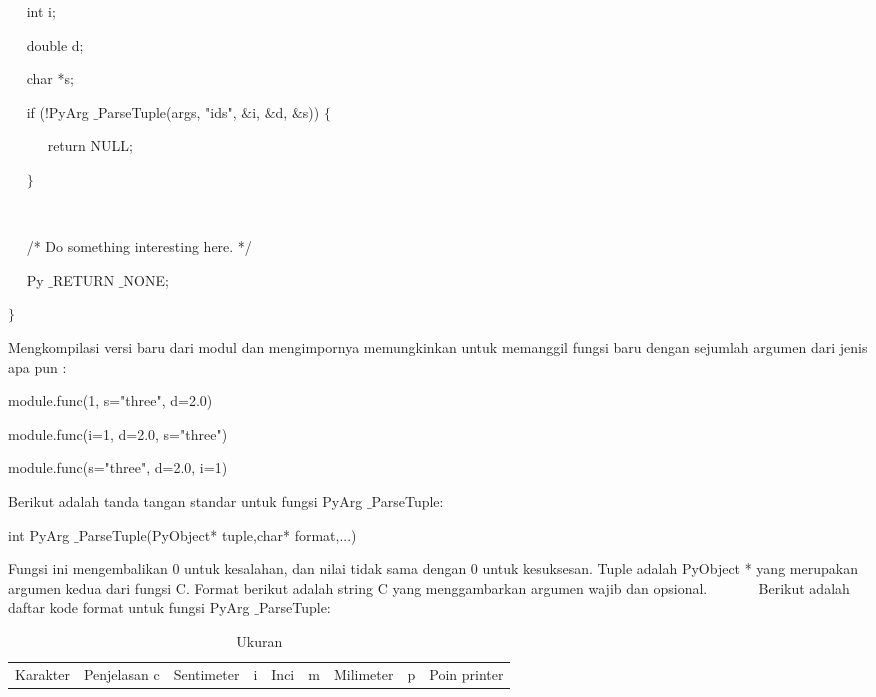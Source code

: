 \noindent 
~~ int i; \par
\noindent 
~~ double d; \par
\noindent 
~~ char *s; \par
\vspace{12pt}
\noindent 
~~ if (!PyArg $  \_  $ParseTuple(args, "ids",  $  \&  $i,  $  \&  $d,  $  \&  $s))  $  \{  $ \par
\noindent 
~~~~~ return NULL; \par
\noindent 
~~  $  \}  $ \par
\noindent 
~~  \par
\noindent 
~~ /* Do something interesting here. */ \par
\noindent 
~~ Py $  \_  $RETURN $  \_  $NONE; \par
\noindent 
 $  \}  $ \par
\vspace{12pt}
Mengkompilasi versi baru dari modul dan mengimpornya memungkinkan untuk memanggil fungsi baru dengan sejumlah argumen dari jenis apa pun : \par
\noindent 
module.func(1, s="three", d=2.0) \par
\noindent 
module.func(i=1, d=2.0, s="three") \par
\noindent 
module.func(s="three", d=2.0, i=1) \par
\vspace{12pt}
\vspace{12pt}
\vspace{12pt}
\vspace{12pt}
\noindent 
 \hspace*{0.5in} Berikut adalah tanda tangan standar untuk fungsi PyArg $  \_  $ParseTuple: \par
\noindent 
int PyArg $  \_  $ParseTuple(PyObject* tuple,char* format,...) \par
\vspace{12pt}
\noindent 
 \hspace*{0.5in} Fungsi ini mengembalikan 0 untuk kesalahan, dan nilai tidak sama dengan 0 untuk kesuksesan. Tuple adalah PyObject * yang merupakan argumen kedua dari fungsi C. Format berikut adalah string C yang menggambarkan argumen wajib dan opsional.\vspace{\baselineskip}
~~~~~~ Berikut adalah daftar kode format untuk fungsi PyArg $  \_  $ParseTuple: \par




\begin{table}[ht]
	\caption{Ukuran}
	\begin{tabular*}{\textwidth}{@{\extracolsep{\fill}}lcc}
		\hline
		Karakter&  Penjelasan \cr
		\hline
		c&Sentimeter&\cr
		i&Inci&\cr
		m&Milimeter&\cr
		p&Poin printer\cr
		\hline
	\end{tabular*}
	\begin{tablenotes}
	\end{tablenotes}
\end{table}

